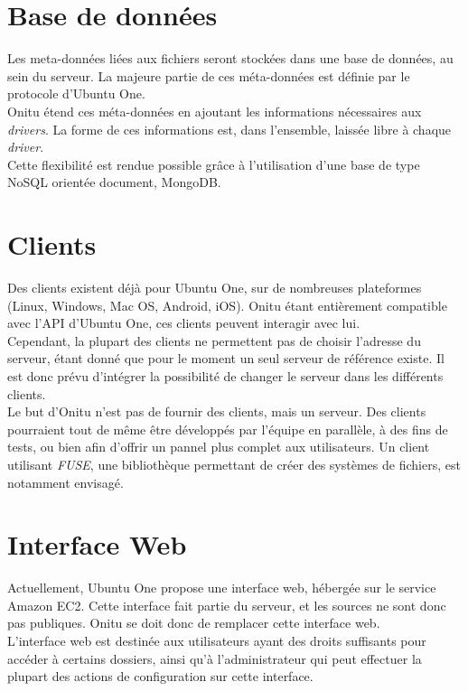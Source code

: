 \section{Base de données}
Les meta-données liées aux fichiers seront stockées dans une base de données, au sein du serveur. La majeure partie de ces méta-données est définie par le protocole d'Ubuntu One.\\

Onitu étend ces méta-données en ajoutant les informations nécessaires aux \textit{drivers}. La forme de ces informations est, dans l'ensemble, laissée libre à chaque \textit{driver}.\\

Cette flexibilité est rendue possible grâce à l'utilisation d'une base de type NoSQL orientée document, MongoDB.

\section{Clients}
Des clients existent déjà pour Ubuntu One, sur de nombreuses plateformes (Linux, Windows, Mac OS, Android, iOS). Onitu étant entièrement compatible avec l'API d'Ubuntu One, ces clients peuvent interagir avec lui.\\

Cependant, la plupart des clients ne permettent pas de choisir l'adresse du serveur, étant donné que pour le moment un seul serveur de référence existe. Il est donc prévu d'intégrer la possibilité de changer le serveur dans les différents clients.\\

Le but d'Onitu n'est pas de fournir des clients, mais un serveur. Des clients pourraient tout de même être développés par l'équipe en parallèle, à des fins de tests, ou bien afin d'offrir un pannel plus complet aux utilisateurs. Un client utilisant \textit{FUSE}, une bibliothèque permettant de créer des systèmes de fichiers, est notamment envisagé.\\

\section{Interface Web}
Actuellement, Ubuntu One propose une interface web, hébergée sur le service Amazon EC2. Cette interface fait partie du serveur, et les sources ne sont donc pas publiques.
Onitu se doit donc de remplacer cette interface web.\\

L'interface web est destinée aux utilisateurs ayant des droits suffisants pour accéder à certains dossiers, ainsi qu'à l'administrateur qui peut effectuer la plupart des actions de configuration sur cette interface.\\

